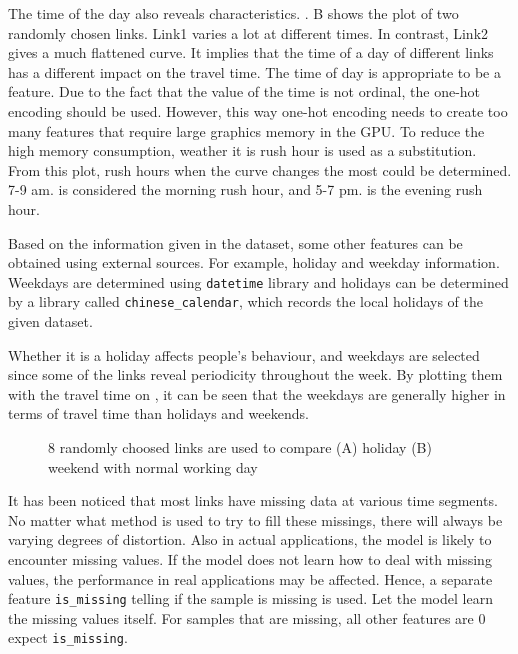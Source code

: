 The time of the day also reveals characteristics. . B shows the plot of two randomly chosen links.
Link1 varies a lot at different times. In contrast, Link2 gives a much flattened curve. It implies that the time of a day of different links has a different impact on the travel time.
The time of day is appropriate to be a feature. Due to the fact that the value of the time is not ordinal, the one-hot encoding should be used. 
However, this way one-hot encoding needs to create too many features that require large graphics memory in the GPU. 
To reduce the high memory consumption, weather it is rush hour is used as a substitution. 
From this plot, rush hours when the curve changes the most could be determined. 7-9 am. is considered the morning rush hour, and 5-7 pm. is the evening rush hour.

Based on the information given in the dataset, some other features can be obtained using external sources. For example, holiday and weekday information.
Weekdays are determined using \verb|datetime| library and holidays can be determined by a library called \verb|chinese_calendar|, which records the local holidays of the given dataset.

Whether it is a holiday affects people's behaviour, and weekdays are selected since some of the links reveal periodicity throughout the week. 
By plotting them with the travel time on , it can be seen that the weekdays are generally higher in terms of travel time than holidays and weekends.

\begin{figure}[!htb]
    \centering
    \caption{8 randomly choosed links are used to compare (A) holiday (B) weekend with normal working day}
    \label{Figure:weekday_holiday}
\end{figure}

It has been noticed that most links have missing data at various time segments.
No matter what method is used to try to fill these missings, there will always be varying degrees of distortion.
Also in actual applications, the model is likely to encounter missing values. 
If the model does not learn how to deal with missing values, the performance in real applications may be affected.
Hence, a separate feature \verb|is_missing| telling if the sample is missing is used. Let the model learn the missing values itself. 
For samples that are missing, all other features are $0$ expect \verb|is_missing|.

